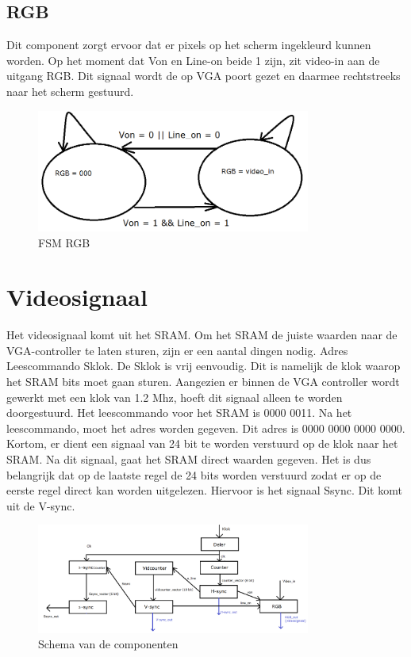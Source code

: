\documentclass[oneside,dutch]{tudelft-report}
\begin{document}
\subsection{RGB}
Dit component zorgt ervoor dat er pixels op het scherm ingekleurd kunnen worden. Op het moment dat Von en Line-on beide 1 zijn, zit video-in aan de uitgang RGB. Dit signaal wordt de op VGA poort gezet en daarmee rechtstreeks naar het scherm gestuurd. 

\begin{figure}[H]
\center
\includegraphics[width=9cm]{FSM-rgb}
\caption{FSM RGB}
\label{VGA}
\end{figure}

\section{Videosignaal}
Het videosignaal komt uit het SRAM. Om het SRAM de juiste waarden naar de VGA-controller te laten sturen, zijn er een aantal dingen nodig.
Adres
Leescommando
Sklok.
De Sklok is vrij eenvoudig. Dit is namelijk de klok waarop het SRAM bits moet gaan sturen. Aangezien er binnen de VGA controller wordt gewerkt met een klok van 1.2 Mhz, hoeft dit signaal alleen te worden doorgestuurd. Het leescommando voor het SRAM is 0000 0011. Na het leescommando, moet het adres worden gegeven. Dit adres is 0000 0000 0000 0000. Kortom, er dient een signaal van 24 bit te worden verstuurd op de klok naar het SRAM. Na dit signaal, gaat het SRAM direct waarden gegeven. Het is dus belangrijk dat op de laatste regel de 24 bits worden verstuurd zodat er op de eerste regel direct kan worden uitgelezen. Hiervoor is het signaal Ssync. Dit komt uit de V-sync. 

\begin{figure}[H]
\center
\includegraphics[width=9cm]{schema-met-SRAM}
\caption{Schema van de componenten}
\label{VGA}
\end{figure}
\end{document}

